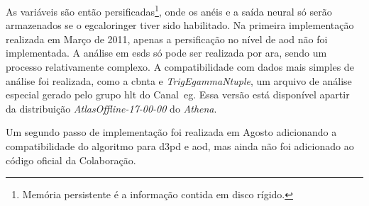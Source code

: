 As variáveis são então persificadas\footnote{Memória persistente é a informação
contida em disco rígido.}, onde os anéis e a saída neural só serão armazenados
se o \gls{egcaloringer} tiver sido habilitado. Na primeira implementação
realizada em Março de 2011, apenas a persificação no nível de \gls{aod} não foi
implementada. A análise em \glspl{esd} só pode ser realizada por \gls{ara},
sendo um processo relativamente complexo.
A compatibilidade com dados mais simples de análise foi realizada, como a
\gls{cbnta} e \emph{TrigEgammaNtuple}, um arquivo de análise especial gerado
pelo grupo \gls{hlt} do Canal~\gls{eg}. Essa versão está disponível apartir da
distribuição \emph{AtlasOffline-17-00-00} do \emph{Athena}.

Um segundo passo de implementação foi realizada em Agosto adicionando a
compatibilidade do algoritmo para \gls{d3pd} e \gls{aod}, mas ainda não foi
adicionado ao código oficial da Colaboração.



